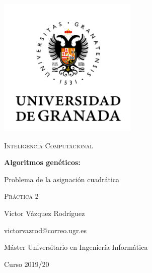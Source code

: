 \documentclass{article}
\begin{document}
\begin{titlepage}
    \centering
    \includegraphics[width=0.5\textwidth]{images/logo-ugr.png}\par
    \vspace{1cm}
    {\Large\scshape Inteligencia Computacional \par}
    {\huge\bfseries Algoritmos genéticos: \par Problema de la asignación
    cuadrática \par}
    \vspace{0.2cm}
    {\scshape Práctica 2 \par}
    \vfill
    {\large Víctor Vázquez Rodríguez  \par}
    {victorvazrod@correo.ugr.es \par}
    \vfill
    {\large Máster Universitario en Ingeniería Informática \par}
    \vspace{0.2cm}
    {Curso 2019/20 \par}
\end{titlepage}

\tableofcontents\newpage

\newpage
\newpage
\newpage
\newpage
\end{document}
